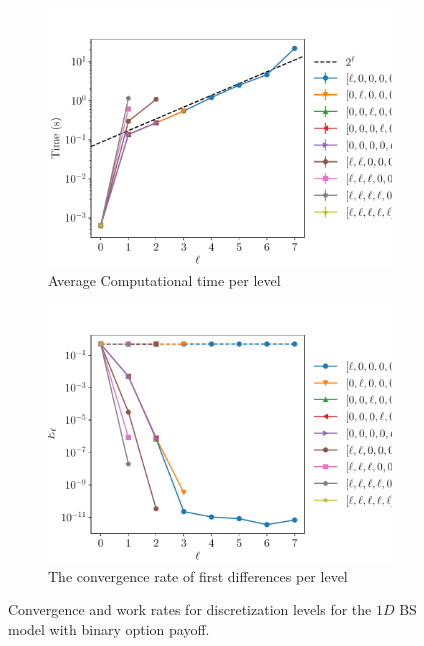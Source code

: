 \documentclass[11pt]{article}
\begin{document}
\begin{figure}[!h]
	\centering
	\begin{subfigure}{.5\textwidth}
		\centering
		\includegraphics[width=0.95\linewidth]{./figures/binary_16_steps/level_work.pdf}
		\caption{Average Computational time per level}
		\label{fig:misc_binary_16_steps_sub3}
	\end{subfigure}%
	\begin{subfigure}{.5\textwidth}
		\centering
		\includegraphics[width=0.95\linewidth]{./figures/binary_16_steps/levels_error_rate.pdf}
		\caption{ The convergence rate of first differences per level}
		\label{fig:misc_binary_16_steps_sub4}
	\end{subfigure}%
	\caption{Convergence and work rates for discretization levels for the $1D$ BS model with binary option payoff.}
	\label{fig:misc_binary_16_steps_2}
\end{figure}
\end{document}
